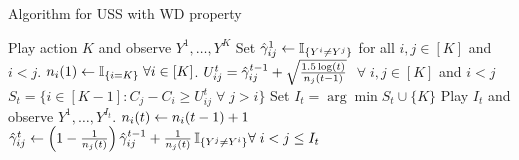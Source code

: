 \documentclass[11pt]{article} %
\begin{document}
\begin{center}
\begin{minipage}{0.48\textwidth}
		\begin{algorithm}[H]
			\caption{Algorithm for USS with WD property} %
			\label{alg:UCB}
			\begin{algorithmic}[1]
				\STATE Play action $K$ and observe $Y^1,\dots,Y^K$
				\STATE Set $\hat{\gamma}_{ij}^1 \leftarrow \mathbb{I}_{\{Y^i\ne Y^j\}}$ for all $i,j\in [K]$ and $i < j$.
				\STATE $n_i(1)\leftarrow \mathbb{I}_{\{i=K\}} \; \forall i\in [K]$.
				\STATE $U_{ij}^t=\hat{\gamma}_{ij}^{t-1} + \sqrt{\frac{1.5\log(t)}{n_j(t-1)}}$  $\;\forall \; i,j \in [K]$ and $i<j$ \label{algo:UCB}
				\STATE $S_t=\{i \in [K-1]: C_j-C_i \geq U_{ij}^t \;\forall \;   j > i \}$ \label{algo:sort}
				\STATE Set $I_t= \arg \min S_t \cup \{K\} $
				\STATE Play $I_t$ and observe $Y^1,\dots,Y^{I_t}$.
				\STATE $n_i(t) \leftarrow n_i(t-1)+1$\\
				 \STATE $\hat{\gamma}_{ij}^t \leftarrow \left (1-\frac{1}{n_j(t)}\right )
				 \hat{\gamma}_{ij}^{t-1} + \frac{1}{n_j(t)} \,\mathbb{I}_{\{Y^j\ne Y^i\}} \forall \; i<j \leq I_t$ \label{algo:Update}
				\ENDFOR
				\ENDFOR
			\end{algorithmic}
		\end{algorithm}
	\end{minipage}
\end{center}
\end{document}
